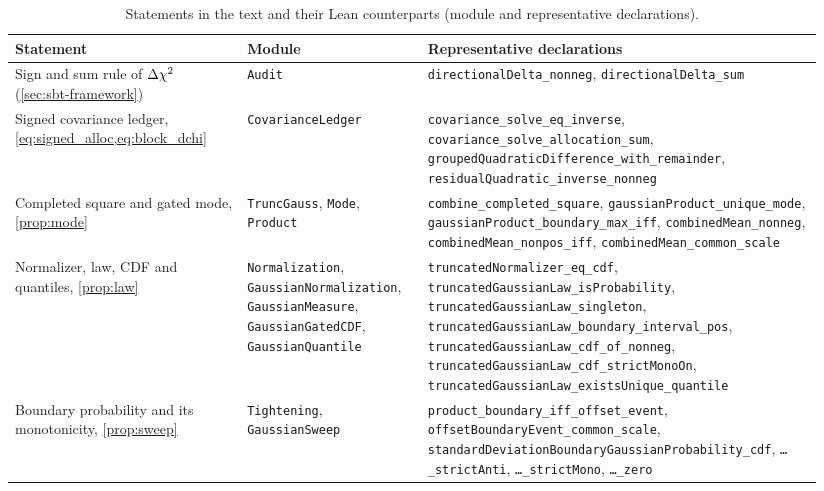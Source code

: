 \begin{table}[h]
  \centering
  \caption{Statements in the text and their Lean counterparts (module and representative declarations).}
  \label{tab:lean}
  \footnotesize
  \setlength{\tabcolsep}{4pt}
  \begin{tabular}{@{}>{\raggedright\arraybackslash}p{0.27\linewidth} >{\raggedright\arraybackslash}p{0.21\linewidth} >{\raggedright\arraybackslash}p{0.46\linewidth}@{}}
    \toprule
    Statement & Module & Representative declarations \\
    \midrule
    Sign and sum rule of $\Delta \chi^2$ (\cref{sec:sbt-framework}) & \texttt{Audit} & \texttt{directionalDelta\_\allowbreak{}nonneg}, \texttt{directionalDelta\_\allowbreak{}sum} \\
    Signed covariance ledger, \cref{eq:signed_alloc,eq:block_dchi} & \texttt{CovarianceLedger} & \texttt{covariance\_\allowbreak{}solve\_\allowbreak{}eq\_\allowbreak{}inverse}, \texttt{covariance\_\allowbreak{}solve\_\allowbreak{}allocation\_\allowbreak{}sum}, \texttt{groupedQuadraticDifference\_\allowbreak{}with\_\allowbreak{}remainder}, \texttt{residualQuadratic\_\allowbreak{}inverse\_\allowbreak{}nonneg} \\
    Completed square and gated mode, \cref{prop:mode} & \texttt{TruncGauss}, \texttt{Mode}, \texttt{Product} & \texttt{combine\_\allowbreak{}completed\_\allowbreak{}square}, \texttt{gaussianProduct\_\allowbreak{}unique\_\allowbreak{}mode}, \texttt{gaussianProduct\_\allowbreak{}boundary\_\allowbreak{}max\_\allowbreak{}iff}, \texttt{combinedMean\_\allowbreak{}nonneg}, \texttt{combinedMean\_\allowbreak{}nonpos\_\allowbreak{}iff}, \texttt{combinedMean\_\allowbreak{}common\_\allowbreak{}scale} \\
    Normalizer, law, CDF and quantiles, \cref{prop:law} & \texttt{Normalization}, \texttt{Gaussian\-Normalization}, \texttt{GaussianMeasure}, \texttt{GaussianGatedCDF}, \texttt{GaussianQuantile} & \texttt{truncatedNormalizer\_\allowbreak{}eq\_\allowbreak{}cdf}, \texttt{truncatedGaussianLaw\_\allowbreak{}isProbability}, \texttt{truncatedGaussianLaw\_\allowbreak{}singleton}, \texttt{truncatedGaussianLaw\_\allowbreak{}boundary\_\allowbreak{}interval\_\allowbreak{}pos}, \texttt{truncatedGaussianLaw\_\allowbreak{}cdf\_\allowbreak{}of\_\allowbreak{}nonneg}, \texttt{truncatedGaussianLaw\_\allowbreak{}cdf\_\allowbreak{}strictMonoOn}, \texttt{truncatedGaussianLaw\_\allowbreak{}existsUnique\_\allowbreak{}quantile} \\
    Boundary probability and its monotonicity, \cref{prop:sweep} & \texttt{Tightening}, \texttt{GaussianSweep} & \texttt{product\_\allowbreak{}boundary\_\allowbreak{}iff\_\allowbreak{}offset\_\allowbreak{}event}, \texttt{offsetBoundaryEvent\_\allowbreak{}common\_\allowbreak{}scale}, \texttt{standardDeviation\-Boundary\-Gaussian\-Probability\_\allowbreak{}cdf}, \texttt{\dots\_\allowbreak{}strictAnti}, \texttt{\dots\_\allowbreak{}strictMono}, \texttt{\dots\_\allowbreak{}zero} \\

\end{tabular}
\end{table}
